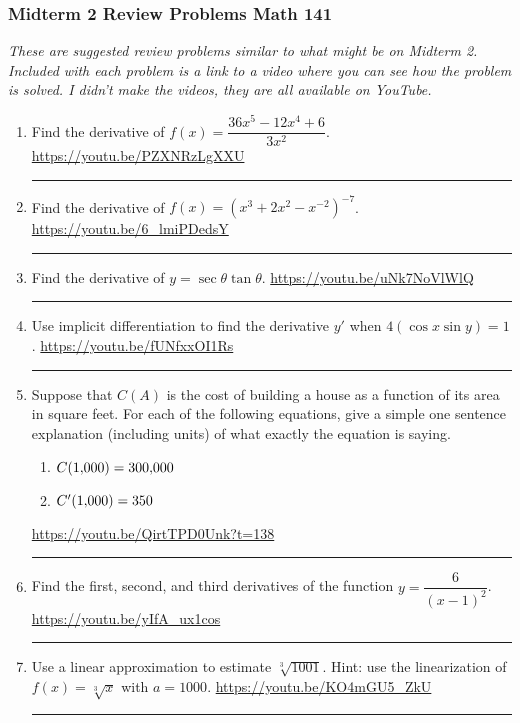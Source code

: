 \documentclass[12pt]{article}
\begin{document}
\pagestyle{empty}
\subsubsection*{Midterm 2 Review Problems \hfill Math 141 }
\textit{These are suggested review problems similar to what might be on Midterm 2. Included with each problem is a link to a video where you can see how the problem is solved. I didn't make the videos, they are all  available on YouTube.}

\begin{enumerate}
\item Find the derivative of $f(x) = \dfrac{36x^5 - 12 x^4 + 6}{3x^2}$. 
\vfill 
\hfill  \url{https://youtu.be/PZXNRzLgXXU} 
\hrule 

\item Find the derivative of $f(x) = (x^3 + 2x^2 - x^{-2})^{-7}$.
\vfill 
\hfill  \url{https://youtu.be/6_lmiPDedsY} 
\hrule 

\item Find the derivative of $y = \sec \theta  \tan \theta$.
\vfill
\hfill \url{https://youtu.be/uNk7NoVlWlQ}
\hrule


\item Use implicit differentiation to find the derivative $y'$ when $ 4 \left( \cos x \sin y \right) = 1$.
\vfill
\hfill \url{https://youtu.be/fUNfxxOI1Rs}
\hrule

\newpage
\item Suppose that $C(A)$ is the cost of building a house as a function of its area in square feet.  For each of the following equations, give a simple one sentence explanation (including units) of what exactly the equation is saying. 
\begin{enumerate}
\item $C(1{\small,}000) = 300{\small,}000$
\item $C'(1{\small,}000) = 350$ 
\end{enumerate}
\vfill
\hfill \url{https://youtu.be/QirtTPD0Unk?t=138}
\hrule

\item Find the first, second, and third derivatives of the function $y = \dfrac{6}{(x-1)^2}$. 
\vfill
\hfill \url{https://youtu.be/yIfA_ux1cos}
\hrule


\item Use a linear approximation to estimate $\sqrt[3]{1001}$.  Hint: use the linearization of $f(x) = \sqrt[3]{x}$ with $a = 1000$. 
\vfill
\hfill \url{https://youtu.be/KO4mGU5_ZkU}
\hrule


\end{enumerate}
\end{document}
